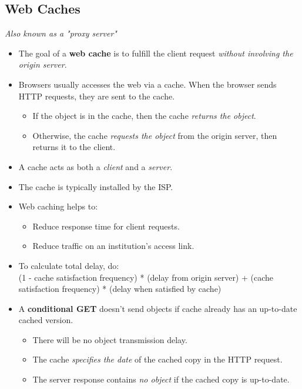 \documentclass{article}
\begin{document}
\subsection{Web Caches}
\vspace{-3mm}
{\it Also known as a "proxy server"}

\begin{itemize}
\item The goal of a {\bf web cache} is to fulfill the client request {\it without involving the origin server}.
\item Browsers usually accesses the web via a cache. When the browser sends HTTP requests, they are sent to the cache.
\begin{itemize}
\item If the object is in the cache, then the cache {\it returns the object}.
\item Otherwise, the cache {\it requests the object} from the origin server, then returns it to the client.
\end{itemize}
\item A cache acts as both a {\it client} and a {\it server}.
\item The cache is typically installed by the ISP.
\item Web caching helps to:
\begin{itemize}
\item Reduce response time for client requests.
\item Reduce traffic on an institution's access link.
\end{itemize}
\item To calculate total delay, do:\\
(1 - cache satisfaction frequency) * (delay from origin server) + (cache satisfaction frequency) * (delay when satisfied by cache)
\item A {\bf conditional GET} doesn't send objects if cache already has an up-to-date cached version.
\begin{itemize}
\item There will be no object transmission delay.
\item The cache {\it specifies the date} of the cached copy in the HTTP request.
\item The server response contains {\it no object} if the cached copy is up-to-date.
\end{itemize}
\end{itemize}
\end{document}
